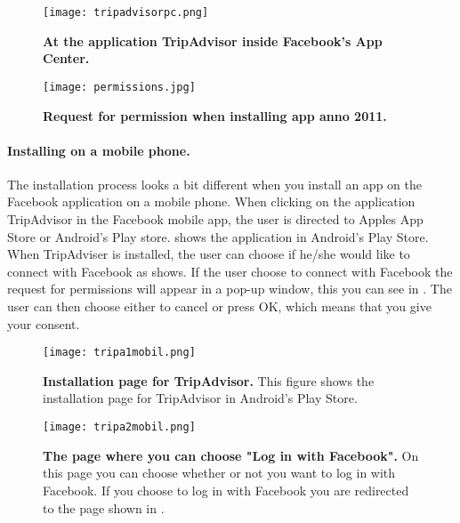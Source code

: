 \begin{figure}[h!]
\centering
\texttt{[image: tripadvisorpc.png]}
\caption[At the application TripAdvisor inside Facebook's App Center]{\textbf{At the application TripAdvisor inside Facebook's App Center.} } 
\label{fig:tripadvisorpc}
\end{figure}

\begin{figure}[h!]
\centering
\texttt{[image: permissions.jpg]}
\caption[Request for permission when installing app anno 2011]{\textbf{Request for permission when installing app anno 2011.} } 
\label{fig:permissions2011}
\end{figure}

\paragraph{Installing on a mobile phone.}
The installation process looks a bit different when you install an app on the Facebook application on a mobile phone. When clicking on the application TripAdvisor in the Facebook mobile app, the user is directed to Apples App Store or Android's Play store.  shows the application in Android's Play Store. When TripAdviser is installed, the user can choose if he/she would like to connect with Facebook as  shows. If the user choose to connect with Facebook the request for permissions will appear in a pop-up window, this you can see in . The user can then choose either to cancel or press OK, which means that you give your consent. 


\begin{figure}[h!]
\centering
\texttt{[image: tripa1mobil.png]}
\caption[Installation page for TripAdvisor]{\textbf{Installation page for TripAdvisor.} This figure shows the installation page for TripAdvisor in Android's Play Store.} 
\label{fig:tripa1mobil}
\end{figure}

\begin{figure}[h!]
\centering
\texttt{[image: tripa2mobil.png]}
\caption[The page where you choose "Log in with Facebook"]{\textbf{The page where you can choose "Log in with Facebook".} On this page you can choose whether or not you want to log in with Facebook. If you choose to log in with Facebook you are redirected to the page shown in .} 
\label{fig:tripa2mobil}
\end{figure}

